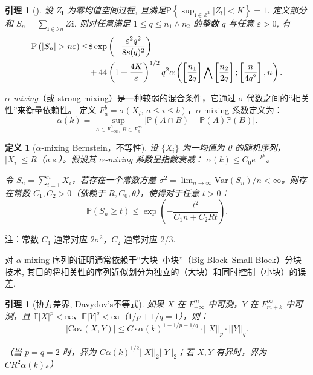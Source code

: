\documentclass[a4paper,openay,14pt]{ctexbook}
\numberwithin{equation}{section}
\numberwithin{lem}{section}
\newtheorem{lemma}[theorem]{引理}%
\newtheorem{definition}[theorem]{定义}%
\begin{document}
\begin{lemma}[\cite{yao2003exponential}]\label{Lemma:Bernstein}
设 ${Z_{\mathbf{i}}}$ 为零均值空间过程, 且满足$\mathrm{P}\left\{\sup_{\mathbf{i}\in\mathbb{Z}^2}\left\vert Z_{\mathbf{i}}\right\vert<K\right\} = 1$. 定义部分和 $S_n=\sum_{\mathbf{i}\in\mathcal{I}n} Z{\mathbf{i}}$. 则对任意满足 $1\le q\le n_1\wedge n_2$ 的整数 $q$ 与任意 $\varepsilon>0$, 有
\begin{align*}
    \mathrm{P}\left(\left|S_n\right|>n \varepsilon\right) \leq
    &8\exp \left(-\frac{\varepsilon^2 q^2}{8 s(q)^2}\right)\notag\\
    &+ 44\left(1+\frac{4 K}{\varepsilon}\right)^{1 / 2} q^2 \alpha\left(\left[\frac{n_1}{2 q}\right] \bigwedge\left[\frac{n_2}{2 q}\right] ;\left[\frac{n}{4 q^2}\right], n\right).
    \end{align*}
\end{lemma}


\textit{$\alpha$-mixing}（或 strong mixing）是一种较弱的混合条件，它通过 $\sigma$-代数之间的“相关性”来衡量依赖性。
定义 $F_a^b = \sigma(X_i,\, a \le i \le b)$，$\alpha$-mixing 系数定义为：
\[
\alpha(k) = \sup_{A\in F_{-\infty}^0,\, B\in F_k^\infty} \bigl| \mathbb{P}(A\cap B) - \mathbb{P}(A)\mathbb{P}(B) \bigr|.
\]

\begin{definition}[{$\alpha$-mixing Bernstein，不等性}]
设 $\{X_i\}$ 为一均值为 0 的随机序列，$|X_i| \le R$（a.s.）。假设其 $\alpha$-mixing 系数呈指数衰减：
$\alpha(k) \le C_0 e^{-k^\theta}$。

令 $S_n = \sum_{i=1}^n X_i$，若存在一个常数方差 $\sigma^2 = \lim_{n\to\infty}\mathrm{Var}(S_n)/n < \infty$。则存在常数
$C_1, C_2 > 0$（依赖于 $R, C_0, \theta$），使得对于任意 $t>0$：
\[
\mathbb{P}(S_n \ge t) \le \exp\left( - \frac{t^2}{C_1 n + C_2 R t} \right).
\]

\end{definition}

\noindent
{ 注：常数 $C_1$ 通常对应 $2\sigma^2$，$C_2$ 通常对应 $2/3$.}

对 $\alpha$-mixing 序列的证明通常依赖于“大块–小块”（Big-Block–Small-Block）分块技术, 其目的将相关性的序列近似划分为独立的（大块）和同时控制（小块）的误差.

\begin{lemma}[协方差界, Davydov's不等式]
如果 $X$ 在 $F_{-\infty}^m$ 中可测，$Y$ 在 $F_{m+k}^\infty$ 中可测，且 $\mathbb{E}|X|^p < \infty$、$\mathbb{E}|Y|^q < \infty$（$1/p + 1/q = 1$），则：
$$|\mathrm{Cov}(X,Y)| \le C \cdot \alpha(k)^{1 - 1/p - 1/q} \cdot || X ||_p \cdot ||Y||_q.$$

（当 $p = q = 2$ 时，界为 $C \alpha(k)^{1/2} ||X||_2 ||Y||_2$；若 $X,Y$ 有界时，界为 $CR^2\alpha(k)$。）
\end{lemma}
\end{document}

